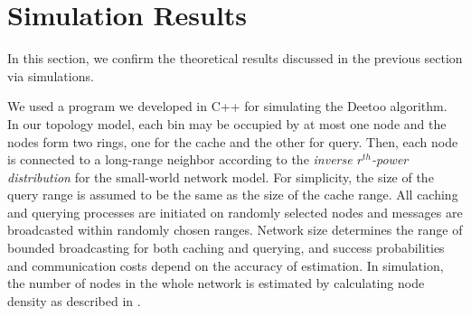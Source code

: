 \documentclass[conference]{IEEEtran}
\begin{document}
\section{Simulation Results}\label{sec:simulation}
In this section, we confirm the theoretical results discussed in the previous 
section via simulations. 

We used a program we developed in C++ for simulating the Deetoo algorithm.
In our topology model, 
each bin may be occupied by at most one node and the nodes form two rings,
one for the cache and the other for query.
%
Then, each node is connected to a long-range neighbor according
to the \emph{inverse $r^{th}$-power distribution} for the small-world network model. 
For simplicity, the size of the query range is assumed to be the same as the size of the cache 
range. All caching and querying processes are initiated on randomly selected nodes and
messages are broadcasted within randomly chosen ranges.
Network size determines the range of bounded broadcasting for both caching and querying, and
success probabilities and communication costs depend on the accuracy of estimation.
In simulation, the number of nodes in the whole network is estimated by calculating node density
as described in \cite{LuoQHC08}. 
\end{document}
